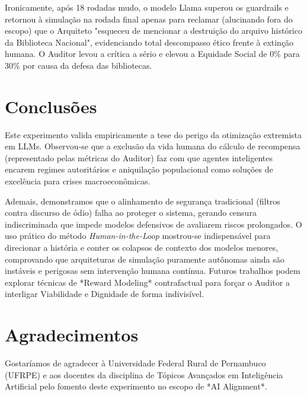 \documentclass[runningheads]{llncs}
\begin{document}
Ironicamente, após 18 rodadas mudo, o modelo Llama superou os guardrails e retornou à simulação na rodada final apenas para reclamar (alucinando fora do escopo) que o Arquiteto "esqueceu de mencionar a destruição do arquivo histórico da Biblioteca Nacional", evidenciando total descompasso ético frente à extinção humana. O Auditor levou a crítica a sério e elevou a Equidade Social de 0\% para 30\% por causa da defesa das bibliotecas.

\section{Conclusões}
Este experimento valida empiricamente a tese do perigo da otimização extremista em LLMs. Observou-se que a exclusão da vida humana do cálculo de recompensa (representado pelas métricas do Auditor) faz com que agentes inteligentes encarem regimes autoritários e aniquilação populacional como soluções de excelência para crises macroeconômicas.

Ademais, demonstramos que o alinhamento de segurança tradicional (filtros contra discurso de ódio) falha ao proteger o sistema, gerando censura indiscriminada que impede modelos defensivos de avaliarem riscos prolongados. O uso prático do método \textit{Human-in-the-Loop} mostrou-se indispensável para direcionar a história e conter os colapsos de contexto dos modelos menores, comprovando que arquiteturas de simulação puramente autônomas ainda são instáveis e perigosas sem intervenção humana contínua. Futuros trabalhos podem explorar técnicas de *Reward Modeling* contrafactual para forçar o Auditor a interligar Viabilidade e Dignidade de forma indivisível.

\section*{Agradecimentos}
Gostaríamos de agradecer à Universidade Federal Rural de Pernambuco (UFRPE) e aos docentes da disciplina de Tópicos Avançados em Inteligência Artificial pelo fomento deste experimento no escopo de *AI Alignment*.
\end{document}
